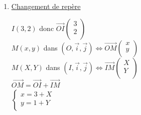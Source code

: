 \newpage

\begin{enumerate}

\renewcommand{\theenumi}{\alph{enumi})}
\item \underline{Changement de repère}  

\medskip 

$I(3,2)$ donc $\overrightarrow{OI} \left(\begin{array}{c}
                                                           3\\
                                                           2\\
                                                      \end{array} \right)$ \\
                                                      
$M(x,y)$ dans $(O, \vec{i}, \vec{j}) 
      \Longleftrightarrow \overrightarrow{OM} \left(\begin{array}{c}
                                                           x\\
                                                           y\\
                                                      \end{array} \right)$\\
                                                      
$M(X,Y)$ dans $(I, \vec{i}, \vec{j}) 
      \Longleftrightarrow \overrightarrow{IM} \left(\begin{array}{c}
                                                           X\\
                                                           Y\\
                                                      \end{array} \right)$\\                               

$\overrightarrow{OM} = \overrightarrow{OI} + \overrightarrow{IM} $\\

$\begin{cases}
  x =  3 + X \\
  y =  1 + Y \\
 \end{cases}$ \\
         

\end{enumerate}
